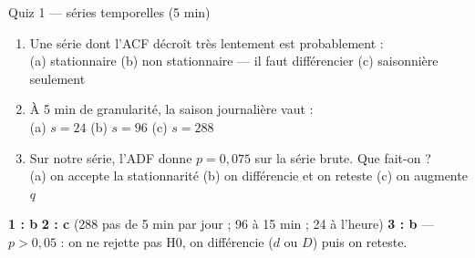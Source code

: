 \begin{frame}{Quiz 1 --- séries temporelles (5 min)}
\begin{qbox}[3 questions]
\begin{enumerate}
\item Une série dont l'ACF décroît très lentement est probablement :\\
(a) stationnaire \quad (b) non stationnaire --- il faut différencier \quad
(c) saisonnière seulement
\item À 5 min de granularité, la saison journalière vaut :\\
(a) $s = 24$ \quad (b) $s = 96$ \quad (c) $s = 288$
\item Sur notre série, l'ADF donne $p = 0{,}075$ sur la série brute. Que
fait-on ?\\
(a) on accepte la stationnarité \quad (b) on différencie et on reteste
\quad (c) on augmente $q$
\end{enumerate}
\end{qbox}
\vspace{1mm}
\begin{solbox}[Réponses]
\textbf{1 : b} \quad \textbf{2 : c} (288 pas de 5 min par jour ; 96 à
15 min ; 24 à l'heure) \quad \textbf{3 : b} --- $p > 0{,}05$ : on ne
rejette pas H0, on différencie ($d$ ou $D$) puis on reteste.
\end{solbox}
\end{frame}
